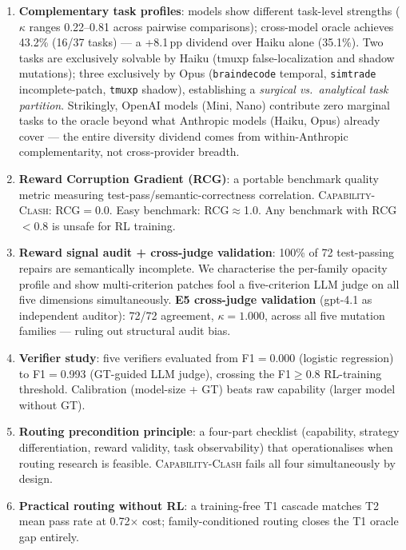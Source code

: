 \documentclass[sigconf,review,anonymous]{acmart}
\newcommand{\ccbench}{\textsc{Capability-Clash}}
\newcommand{\pp}{\,pp}
\begin{document}
\begin{enumerate}[leftmargin=*,itemsep=2pt]
  \item \textbf{Complementary task profiles}: models show different task-level strengths ($\kappa$ ranges 0.22–0.81 across pairwise comparisons); cross-model oracle achieves 43.2\% (16/37 tasks) — a +8.1\pp{} dividend over Haiku alone (35.1\%). Two tasks are exclusively solvable by Haiku (tmuxp false-localization and shadow mutations); three exclusively by Opus (\texttt{braindecode} temporal, \texttt{simtrade} incomplete-patch, \texttt{tmuxp} shadow), establishing a \emph{surgical vs.\ analytical task partition}. Strikingly, OpenAI models (Mini, Nano) contribute zero marginal tasks to the oracle beyond what Anthropic models (Haiku, Opus) already cover — the entire diversity dividend comes from within-Anthropic complementarity, not cross-provider breadth.

  \item \textbf{Reward Corruption Gradient (RCG)}: a portable benchmark quality metric measuring test-pass/semantic-correctness correlation. \ccbench{}: RCG$=$0.0. Easy benchmark: RCG$\approx$1.0. Any benchmark with RCG$<$0.8 is unsafe for RL training.

  \item \textbf{Reward signal audit + cross-judge validation}: 100\% of 72 test-passing repairs are semantically incomplete. We characterise the per-family opacity profile and show multi-criterion patches fool a five-criterion LLM judge on all five dimensions simultaneously. \textbf{E5 cross-judge validation} (gpt-4.1 as independent auditor): 72/72 agreement, $\kappa=1.000$, across all five mutation families — ruling out structural audit bias.

  \item \textbf{Verifier study}: five verifiers evaluated from F1$=$0.000 (logistic regression) to F1$=$0.993 (GT-guided LLM judge), crossing the F1$\geq$0.8 RL-training threshold. Calibration (model-size + GT) beats raw capability (larger model without GT).

  \item \textbf{Routing precondition principle}: a four-part checklist (capability, strategy differentiation, reward validity, task observability) that operationalises when routing research is feasible. \ccbench{} fails all four simultaneously by design.

  \item \textbf{Practical routing without RL}: a training-free T1 cascade matches T2 mean pass rate at 0.72$\times$ cost; family-conditioned routing closes the T1 oracle gap entirely.
\end{enumerate}
\end{document}
